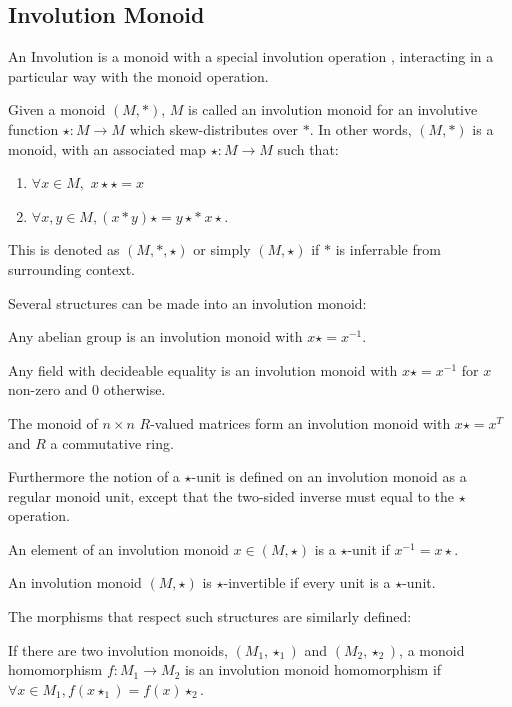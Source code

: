 \subsection{Involution Monoid}
An Involution is a monoid with a special involution operation , interacting in a particular way with the 
monoid operation.
\begin{definition}
  \leanok
  Given a monoid $(M,*)$, $M$ is called an involution monoid for an involutive function $\star:M \rightarrow M$
  which skew-distributes over $*$. In other words, $(M,*)$ is a monoid, with an associated map $\star:M \rightarrow M$
  such that:
  \begin{enumerate}
    \item $\forall x \in M,$  $x \star \star = x$ \\
    \item $\forall x, y \in M, (x * y) \star = y \star  * \: x \star$. \\
  \end{enumerate}
  This is denoted as $(M,*,\star)$ or simply $(M,\star)$ if $*$ is inferrable from surrounding context.
\end{definition}
Several structures can be made into an involution monoid:
\begin{proposition}
  \leanok
  Any abelian group is an involution monoid with $x\star = x^{-1}$.
\end{proposition}
\begin{proposition}
  \leanok
  Any field with decideable equality is an involution monoid with $x\star = x^{-1}$ for $x$ non-zero and $0$ otherwise.
\end{proposition}
\begin{proposition}
  \leanok
  The monoid of $n \times n$ $R$-valued matrices form an involution monoid with $x\star = x^{T}$ and $R$ a commutative ring.
\end{proposition}
Furthermore the notion of a $\star$-unit is defined on an involution monoid as a regular monoid unit, except that the two-sided inverse must
equal to the $\star$ operation.
\begin{definition}
  \leanok
  An element of an involution monoid $x \in (M , \star)$ is a $\star$-unit if $x^{-1} = x\star$.
\end{definition}
\begin{definition}
  \leanok
  An involution monoid $(M,\star)$ is $\star$-invertible if every unit is a $\star$-unit.
\end{definition}
The morphisms that respect such structures are similarly defined:
\begin{definition}
  \leanok
  If there are two involution monoids, $(M_{1},\star_{1})$ and $(M_{2},\star_{2})$, a monoid homomorphism $f : M_{1} \rightarrow M_{2}$ 
  is an involution monoid homomorphism if $\forall x ∈ M_{1}, f (x\star_{1}) = f (x)\star_{2}$.
\end{definition}
